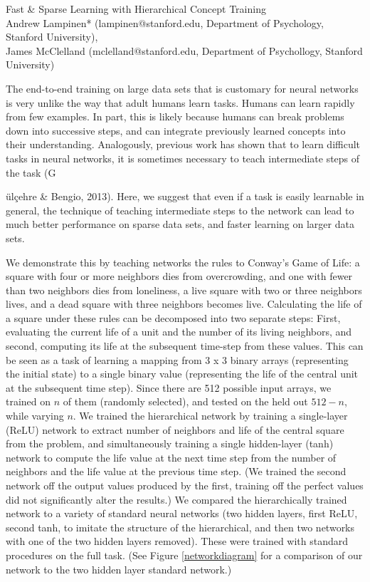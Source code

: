\documentclass[10pt]{article}
\begin{document}
\begingroup  
  \centering
  \large Fast \& Sparse Learning with Hierarchical Concept Training\\[1em]
  \small{Andrew Lampinen* (lampinen@stanford.edu, Department of Psychology, Stanford University),\\ James McClelland (mclelland@stanford.edu, Department of Psychollogy, Stanford University)}\par
\endgroup
\vspace{10pt}
The end-to-end training on large data sets that is customary for neural networks is very unlike the way that adult humans learn tasks. Humans can learn rapidly from few examples. In part, this is likely because humans can break problems down into successive steps, and can integrate previously learned concepts into their understanding. Analogously, previous work has shown that to learn difficult tasks in neural networks, it is sometimes necessary to teach intermediate steps of the task (G{\"{u}l\c{c}ehre \& Bengio, 2013). Here, we suggest that even if a task is easily learnable in general, the technique of teaching intermediate steps to the network can lead to much better performance on sparse data sets, and faster learning on larger data sets.\par
We demonstrate this by teaching networks the rules to Conway's Game of Life: a square with four or more neighbors dies from overcrowding, and one with fewer than two neighbors dies from loneliness, a live square with two or three neighbors lives, and a dead square with three neighbors becomes live. Calculating the life of a square under these rules can be decomposed into two separate steps: First, evaluating the current life of a unit and the number of its living neighbors, and second, computing its life at the subsequent time-step from these values. This can be seen as a task of learning a mapping from 3 x 3 binary arrays (representing the initial state) to a single binary value (representing the life of the central unit at the subsequent time step). Since there are 512 possible input arrays, we trained on $n$ of them (randomly selected), and tested on the held out $512-n$, while varying $n$. We trained the hierarchical network by training a single-layer (ReLU) network to extract number of neighbors and life of the central square from the problem, and simultaneously training a single hidden-layer (tanh) network to compute the life value at the next time step from the number of neighbors and the life value at the previous time step. (We trained the second network off the output values produced by the first, training off the perfect values did not significantly alter the results.) We compared the hierarchically trained network to a variety of standard neural networks (two hidden layers, first ReLU, second tanh, to imitate the structure of the hierarchical, and then two networks with one of the two hidden layers removed). These were trained with standard procedures on the full task. (See Figure \ref{networkdiagram} for a comparison of our network to the two hidden layer standard network.)\par
}
\end{document}
